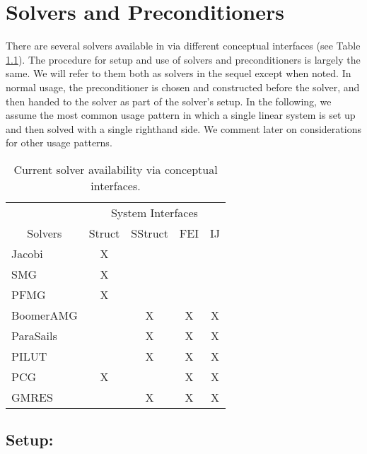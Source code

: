 \chapter{Solvers and Preconditioners}
\label{Solvers and Preconditioners}

There are several solvers available in \hypre{} via different
conceptual interfaces (see Table \ref{table-solver-availability}).
The procedure for setup and use of solvers and preconditioners is
largely the same. We will refer to them both as solvers in the sequel
except when noted.  In normal usage, the preconditioner is chosen and
constructed before the solver, and then handed to the solver as part
of the solver's setup.  In the following, we assume the most common
usage pattern in which a single linear system is set up and then
solved with a single righthand side. We comment later on
considerations for other usage patterns.

\begin{table}[h]
\center
\begin{tabular}{|l||c|c|c|c|}
\hline
                               & \multicolumn{4}{|c|}{System Interfaces} \\
\multicolumn{1}{|c||}{Solvers} & Struct & SStruct & FEI & IJ \\
\hline\hline
Jacobi     & X &   &   &   \\
SMG        & X &   &   &   \\
PFMG       & X &   &   &   \\
BoomerAMG  &   & X & X & X \\
ParaSails  &   & X & X & X \\
PILUT      &   & X & X & X \\
PCG        & X &   & X & X \\
GMRES      &   & X & X & X \\
\hline
\end{tabular}
\caption{%
Current solver availability via \hypre{} conceptual interfaces.
}
\label{table-solver-availability}
\end{table}


\section*{Setup:}

